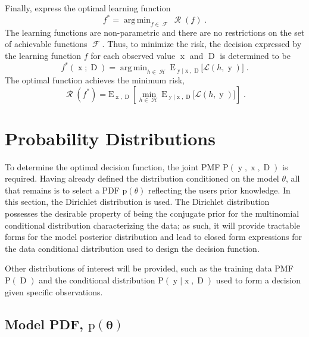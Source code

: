\documentclass[12pt]{report}
\DeclareMathOperator*{\argmin}{arg\,min}
\DeclareMathOperator{\xrm}{\mathrm{x}}
\DeclareMathOperator{\yrm}{\mathrm{y}}
\DeclareMathOperator{\Drm}{\mathrm{D}}
\DeclareMathOperator{\Hcal}{\mathcal{H}}
\DeclareMathOperator{\Fcal}{\mathcal{F}}
\DeclareMathOperator{\Rcal}{\mathcal{R}}
\begin{document}
Finally, express the optimal learning function
\begin{equation} 
f^* = \argmin_{f \in \Fcal} \Rcal(f) \;.
\end{equation}
The learning functions are non-parametric and there are no restrictions on the set of achievable functions $\Fcal$. Thus, to minimize the risk, the decision expressed by the learning function $f$ for each observed value $\xrm$ and $\Drm$ is determined to be
\begin{equation} \label{eq:f_opt_xD}
f^*(\xrm;\Drm) = \argmin_{h \in \Hcal} \text{E}_{\yrm | \xrm,\Drm}\big[ \mathcal{L}(h,\yrm) \big] \;.
\end{equation}
The optimal function achieves the minimum risk,
\begin{equation} \label{eq_risk_min}
\Rcal(f^*) = \text{E}_{\xrm,\Drm} \left[ \min_{h \in \Hcal} \text{E}_{\yrm | \xrm,\Drm}\big[ \mathcal{L}(h,\yrm) \big] \right] \;.
\end{equation}









\section{Probability Distributions}

To determine the optimal decision function, the joint PMF $\text{P}(\yrm,\xrm,\Drm)$ is required. Having already defined the distribution conditioned on the model $\theta$, all that remains is to select a PDF $\text{p}(\theta)$ reflecting the users prior knowledge. In this section, the Dirichlet distribution is used. The Dirichlet distribution possesses the desirable property of being the conjugate prior for the multinomial conditional distribution characterizing the data; as such, it will provide tractable forms for the model posterior distribution and lead to closed form expressions for the data conditional distribution used to design the decision function.

Other distributions of interest will be provided, such as the training data PMF $\text{P}(\Drm)$ and the conditional distribution $\text{P}(\yrm | \xrm,\Drm)$ used to form a decision given specific observations.



\subsection{Model PDF, $\text{p}(\bm{\theta})$} \label{sec:P_theta}
\end{document}
